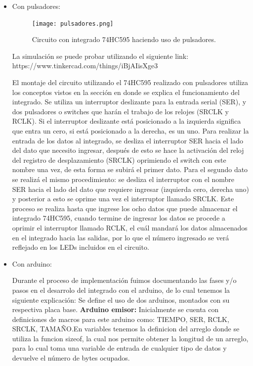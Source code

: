 \documentclass{article}
\begin{document}
\begin{itemize}
\item Con pulsadores: 

\begin{figure}[h]
\texttt{[image: pulsadores.png]}
\centering
\caption{Circuito con integrado 74HC595 haciendo uso de pulsadores.}
\label{fig:pulsadores}
\end{figure}

La simulación se puede probar utilizando el siguiente link: https://www.tinkercad.com/things/iBjAIisXge3

El montaje del circuito utilizando el 74HC595 realizado con pulsadores utiliza los conceptos vistos en la sección en donde se explica el funcionamiento del integrado. 
Se utiliza un interruptor deslizante para la entrada serial (SER), y dos pulsadores o switches que harán el trabajo de los relojes (SRCLK y RCLK). Si el interruptor deslizante está posicionado a la izquierda significa que entra un cero, si está posicionado a la derecha, es un uno. 
Para realizar la entrada de los datos al integrado, se desliza el interruptor SER hacia el lado del dato que necesito ingresar, después de esto se hace la activación del reloj del registro de desplazamiento (SRCLK) oprimiendo el switch con este nombre una vez, de esta forma se subirá el primer dato. Para el segundo dato se realizá el mismo procedimiento: se desliza el interruptor con el nombre SER hacia el lado del dato que requiere ingresar (izquierda cero, derecha uno) y posterior a esto se oprime una vez el interruptor llamado SRCLK. Este proceso se realiza hasta que ingrese los ocho datos que puede almacenar el integrado 74HC595, cuando termine de ingresar los datos se procede a oprimir el interruptor llamado RCLK, el cuál mandará los datos almacenados en el integrado hacia las salidas, por lo que el número ingresado se verá reflejado en los LEDs incluidos en el circuito.

\item Con arduino: 

Durante el proceso de implementación fuimos documentando las fases y/o pasos en el desarrolo del integrado con el arduino, de lo cual tenemos la siguiente explicación: \newline
Se define el uso de dos arduinos, montados con su respectiva placa base.
\textbf{Arduino emisor:} \newline
Inicialmente se cuenta con definiciones de macros para este arduino como: TIEMPO, SER, RCLK, SRCLK, TAMAÑO.En variables tenemos la definicion del arreglo donde se utiliza la funcion sizeof, la cual nos permite obtener la longitud de un arreglo, para lo cual toma una variable de entrada de cualquier tipo de datos y devuelve el número de bytes ocupados.


\end{itemize}
\end{document}
